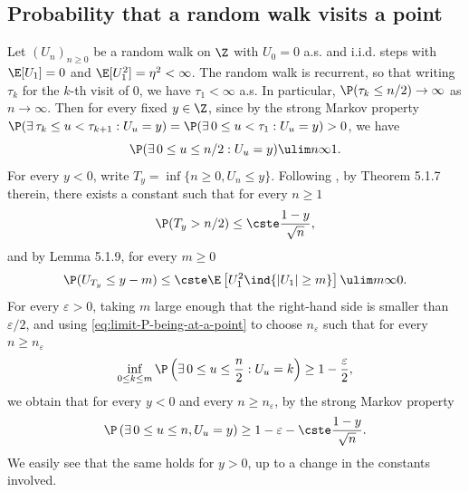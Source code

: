 \documentclass[10pt,a4paper]{article}
\begin{document}
\subsection{Probability that a random walk visits a point}
\label{sec:RW}

Let $(U_n)_{n\geq 0}$ be a random walk on $\Z$ with $U_0 = 0$ a.s. and i.i.d. steps with $\E[U_1]=0$ and $\E[U_1^2]=\eta^2<\infty$. The random walk is recurrent, so that writing $\tau_k$ for the $k$-th visit of $0$, we have $\tau_1 < \infty$ a.s. In particular, $ \P(\tau_k \leq n/2) \to \infty$ as $n\to\infty$. Then for every fixed $y\in\Z$, since by the strong Markov property $\P(\exists\, \tau_k \leq u < \tau_{k+1} : U_u = y) = \P(\exists\, 0 \leq u < \tau_{1} : U_u = y)>0$, we have 
\begin{equation}\label{eq:limit-P-being-at-a-point}
\P(\exists \, 0 \leq u \leq n/2 : U_u = y) \ulim n \infty 1  .  
\end{equation}
%
For every $y<0$, write $T_{y} = \inf\{n\geq 0, U_n \leq y\}$. Following \cite[Section 5.1.1]{lawler2010random}, by Theorem 5.1.7 therein, there exists a constant such that for every $n\geq 1$
\[ \P(T_y > n/2) \leq \cste \frac{1-y}{\sqrt{n}} , \]
and by Lemma 5.1.9, for every $m\geq 0$
\[ \P(U_{T_y} \leq y - m) \leq \cste \E\left[ U_1^2 \ind{|U_1| \geq m} \right] \ulim m \infty 0 . \]
For every $\varepsilon>0$, taking $m$ large enough that the right-hand side is smaller than $\varepsilon/2$, and using \eqref{eq:limit-P-being-at-a-point} to choose $n_\varepsilon$ such that for every $n\geq n_\varepsilon$
\[ \inf_{0\leq k \leq m} \P\left(\exists \, 0\leq u \leq \frac{n}{2}: U_u = k\right) \geq 1-\frac{\varepsilon}{2} , \]
we obtain that for every $y<0$ and every $n \geq n_\varepsilon$, by the strong Markov property
\begin{equation}\label{eq:proba-visit-RW}
\P\left(\exists \, 0 \leq u \leq n, U_u = y\right) \geq 1-\varepsilon-\cste \frac{1-y}{\sqrt{n}} . 
\end{equation}
We easily see that the same holds for $y>0$, up to a change in the constants involved. 
\end{document}
